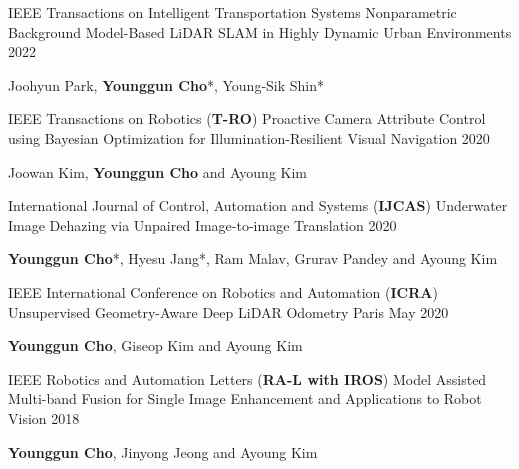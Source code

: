 \begin{cventries}
  \cventry
    {IEEE Transactions on Intelligent Transportation Systems} %
    { Nonparametric Background Model-Based LiDAR SLAM in Highly Dynamic Urban Environments} %
    { } %
    {2022} %
    {
      \begin{cvitems} %
        \item {Joohyun Park, \textbf{Younggun Cho}*, Young-Sik Shin*}
      \end{cvitems}
    }



  \cventry
    {IEEE Transactions on Robotics (\textbf{T-RO})} %
    {Proactive Camera Attribute Control using Bayesian Optimization for Illumination-Resilient Visual Navigation } %
    { } %
    {2020} %
    {
      \begin{cvitems} %
        \item {Joowan Kim, \textbf{Younggun Cho} and Ayoung Kim}
      \end{cvitems}
    }

  \cventry
    {International Journal of Control, Automation and Systems (\textbf{IJCAS})} %
    {Underwater Image Dehazing via Unpaired Image-to-image Translation } %
    { } %
    {2020} %
    {
      \begin{cvitems} %
        \item {\textbf{Younggun Cho}*, Hyesu Jang*, Ram Malav, Grurav Pandey and Ayoung Kim}
      \end{cvitems}
    }

  \cventry
    {IEEE International Conference on Robotics and Automation (\textbf{ICRA})} %
    {Unsupervised Geometry-Aware Deep LiDAR Odometry} %
    {Paris} %
    {May 2020} %
    {
      \begin{cvitems} %
        \item {\textbf{Younggun Cho}, Giseop Kim and Ayoung Kim}
      \end{cvitems}
    }


  \cventry
    {IEEE Robotics and Automation Letters (\textbf{RA-L with IROS})} %
    {Model Assisted Multi-band Fusion for Single Image Enhancement and Applications to Robot Vision
    } %
    { } %
    {2018} %
    {
      \begin{cvitems} %
        \item {\textbf{Younggun Cho}, Jinyong Jeong and Ayoung Kim}
      \end{cvitems}
    }


\end{cventries}
